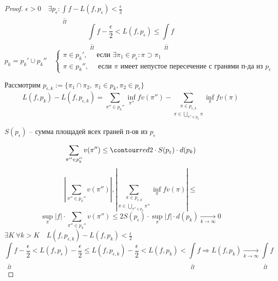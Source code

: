     \begin{proof}
        $\epsilon > 0 \quad \exists p_\epsilon : \underset{\Pi}{\underline{\int}} f - L(f, p_\epsilon) < \frac \epsilon 2$
        \[
            \underset{\Pi}{\underline{\int}} f - \frac{\epsilon}{2} < L(f, p_\epsilon) \le \underset{\Pi}{\underline{\int}} f    
        \]
        $p_k = p_k' \cup p_k'' \quad \begin{cases}
            \pi \in p_k', \quad \text{ если } \exists \pi_1 \in p_\epsilon : \pi \supset \pi_1 \\ %
            \pi \in p_k'', \quad \text{ если } \pi \text{ имеет непустое пересечение с гранями п-да из } p_\epsilon
        \end{cases}$
        \par Рассмотрим $p_{\epsilon, k} := \{\pi_1 \cap \pi_2, \ \pi_1 \in p_k, \pi_2 \in p_\epsilon\}$
        \[
            L(f,p_k) - L(f, p_{\epsilon, k}) = \sum_{\pi'' \in p_k''} \inf_{\pi''} f v(\pi'') 
            - \underset{\pi \in \underset{\pi'' \in p_k}{\bigcup} \pi}{\sum_{\pi \in p_{\epsilon, k}}} \inf_\pi f v(\pi)
        \]

        $S(p_\epsilon)$ -- сумма площадей всех граней п-ов из $p_\epsilon$
        
        \[
            \sum_{\pi'' \in p_k''} v(\pi'') \le \mycontour{2} \cdot S(p_\epsilon) \cdot d(p_k) %
        \]
        \[
            \left|\sum_{\pi'' \in p_k''} v(\pi'')\right|, 
            \left|  
                \underset{\pi \in \underset{{\pi'' \in p_k}}{\bigcup} \pi''}{\sum_{\pi \in p_{\epsilon, k}}}
                \inf_\pi f v(\pi) 
            \right| \le
        \]
        \[
            \sup_\pi |f| \cdot \sum_{\pi'' \in p_k''} v(\pi'') \le 2S(p_\epsilon) \cdot \sup_\pi |f| \cdot d(p_k) \xrightarrow[k \rightarrow \infty]{} 0   
        \]
        $\exists K \ \forall k > K \quad L(f, p_{\epsilon, k}) - L(f, p_k) < \frac \epsilon 2$
        \[
            \underset{\Pi}{\underline{\int}} f - \frac \epsilon 2 < L(f, p_\epsilon) - \frac \epsilon 2 \le L(f, p_{\epsilon, k}) - \frac \epsilon 2 < L(f, p_k) < \underset{\Pi}{\underline{\int}} f \Rightarrow L(f, p_k) \xrightarrow[k \rightarrow \infty]{} \underset{\Pi}{\underline{\int}} f
        \]
    \end{proof}

